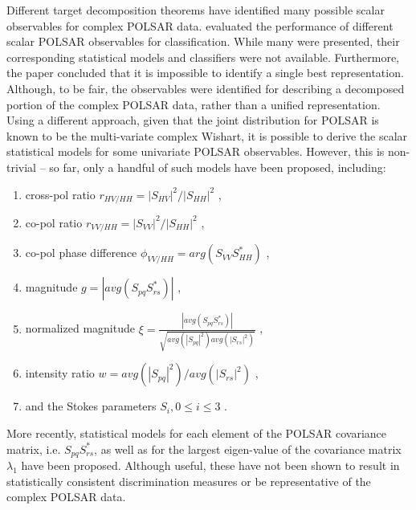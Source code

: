 \documentclass[]{tRSL2e}
\begin{document}
Different target decomposition theorems have identified many possible scalar observables for complex POLSAR data.
\citet{Alberga_2008_IJRS_4129} evaluated the performance of different scalar POLSAR observables for classification.
While many were presented, their corresponding statistical models and classifiers were not available.
Furthermore, the paper concluded that it is impossible to identify a single best representation.
Although, to be fair, the observables were identified for describing a decomposed portion of the complex POLSAR data,
  rather than a unified representation.
%
Using a different approach, given that the joint distribution for POLSAR is known to be the multi-variate complex Wishart,
  it is possible to derive the scalar statistical models for some univariate POLSAR observables.
However, this is non-trivial -- so far, only a handful of such models have been proposed, including:
  \begin{enumerate}
  \item cross-pol ratio $r_{HV/HH} = |S_{HV}|^2/|S_{HH}|^2$ \citep{Joughin_1994_TGRS_562},
  \item co-pol ratio $r_{VV/HH} = |S_{VV}|^2/|S_{HH}|^2$ \citep{Joughin_1994_TGRS_562},
  \item co-pol phase difference $\phi_{VV/HH} = arg(S_{VV}S_{HH}^*) $ \citep{Joughin_1994_TGRS_562} \citep{Lee_1994_TGRS_1017},
  \item magnitude $g=|avg(S_{pq}S_{rs}^*)|$ \citep{Lee_1994_TGRS_1017},
  \item normalized magnitude $\xi = \frac{|avg(S_{pq}S_{rs}^*)|}{\sqrt{avg(|S_{pq}|^2) avg(|S_{rs}|^2)}}$ \citep{Lee_1994_TGRS_1017},
  \item intensity ratio $w = avg(|S_{pq}|^2)/avg(|S_{rs}|^2)$ \citep{Lee_1994_TGRS_1017},
  \item and the Stokes parameters $S_i,0 \leq i \leq 3$ \citep{Touzi_1996_TGRS_519}. 
  \end{enumerate}
More recently, statistical models for
  each element of the POLSAR covariance matrix, i.e. $S_{pq}S_{rs}^*$, \citep{Lopez-Martinez_2003_TGRS_2232}
  as well as for the largest eigen-value of the covariance matrix $\lambda_1$ \citep{Erten_2012_Sensors_2766} have been proposed. Although useful, these have not been shown to result in statistically consistent discrimination measures or 
 be representative of the complex POLSAR data.
\end{document}
